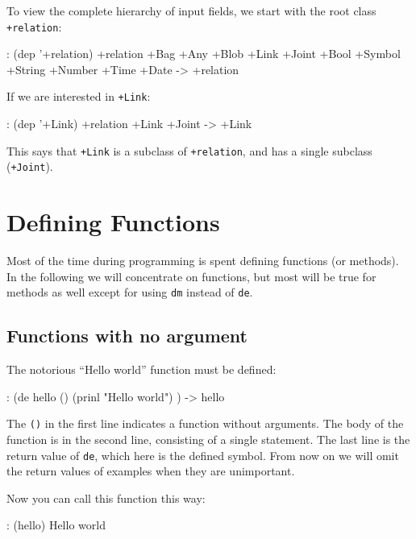 To view the complete hierarchy of input fields, we start with the root
class \texttt{+relation}:


\begin{wideverbatim}
: (dep '+relation)
+relation
   +Bag
   +Any
   +Blob
   +Link
      +Joint
   +Bool
   +Symbol
      +String
   +Number
      +Time
      +Date
-> +relation
\end{wideverbatim}

If we are interested in \texttt{+Link}:


\begin{wideverbatim}
: (dep '+Link)
   +relation
+Link
   +Joint
-> +Link
\end{wideverbatim}

This says that \texttt{+Link} is a subclass of \texttt{+relation}, and has a single
subclass (\texttt{+Joint}).


 
\section{Defining Functions}
\label{sec:tut-defining-functions}


Most of the time during programming is spent defining functions (or
methods). In the following we will concentrate on functions, but most
will be true for methods as well except for using \texttt{dm} instead of \texttt{de}.

 
\subsection{Functions with no argument}
\label{sec:tut-functions-with-no-argument}


The notorious ``Hello world'' function must be defined:


\begin{wideverbatim}
: (de hello ()
   (prinl "Hello world") )
-> hello
\end{wideverbatim}

The \texttt{()} in the first line indicates a function without arguments. The
body of the function is in the second line, consisting of a single
statement. The last line is the return value of \texttt{de}, which here is the
defined symbol. From now on we will omit the return values of examples
when they are unimportant.

Now you can call this function this way:


\begin{wideverbatim}
: (hello)
Hello world
\end{wideverbatim}

